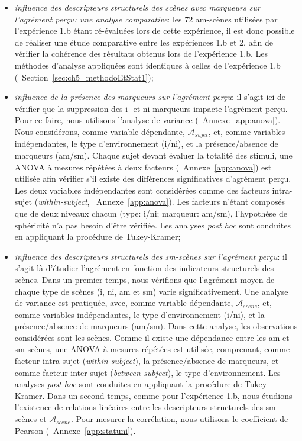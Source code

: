 \begin{itemize}
\item \emph{influence des descripteurs structurels des scènes avec marqueurs sur l'agrément perçu: une analyse comparative}: les 72 am-scènes utilisées par l'expérience 1.b étant ré-évaluées lors de cette expérience, il est donc possible de réaliser une étude comparative entre les expériences 1.b et 2, afin de vérifier la cohérence des résultats obtenus lors de l'expérience 1.b. Les méthodes d'analyse appliquées sont identiques à celles de l'expérience 1.b (\cf~Section~\ref{sec:ch5_methodoEtStat1});
\item \emph{influence de la présence des marqueurs sur l'agrément perçu}: il s'agit ici de vérifier que la suppression des i- et ni-marqueurs impacte l'agrément perçu. Pour ce faire, nous utilisons l'analyse de variance (\cf~Annexe~\ref{app:anova}). Nous considérons, comme variable dépendante,  $\mathcal{A}_{sujet}$, et, comme variables indépendantes, le type d'environnement (i/ni), et la présence/absence de marqueurs (am/sm). Chaque sujet devant évaluer la totalité des stimuli, une ANOVA à mesures répétées à deux facteurs (\cf~Annexe~\ref{app:anova}) est utilisée afin vérifier s'il existe des différences significatives d'agrément perçu. Les deux variables indépendantes sont considérées comme des facteurs intra-sujet (\emph{within-subject}, \cf~Annexe~\ref{app:anova}). Les facteurs n'étant composés que de deux niveaux chacun (type: i/ni; marqueur: am/sm), l'hypothèse de sphéricité n'a pas besoin d'être vérifiée. Les analyses \emph{post hoc} sont conduites en appliquant la procédure de Tukey-Kramer;
\item \emph{influence des descripteurs structurels des sm-scènes sur l'agrément perçu}: il s'agit là d'étudier l'agrément en fonction des indicateurs structurels des scènes. Dans un premier temps, nous vérifions que l'agrément moyen de chaque type de scènes (i, ni, am et sm) varie significativement. Une analyse de variance est pratiquée, avec, comme variable dépendante, $\mathcal{A}_{scene}$, et, comme variables indépendantes, le type d'environnement (i/ni), et la présence/absence de marqueurs (am/sm). Dans cette analyse, les observations considérées sont les scènes. Comme il existe une dépendance entre les am et sm-scènes, une ANOVA à mesures répétées est utilisée, comprenant, comme facteur intra-sujet (\emph{within-subject}), la présence/absence de marqueurs, et comme facteur inter-sujet (\emph{between-subject}), le type d'environnement. Les analyses \emph{post hoc} sont conduites en appliquant la procédure de Tukey-Kramer. Dans un second temps, comme pour l'expérience 1.b, nous étudions l'existence de relations linéaires entre les descripteurs structurels des sm-scènes et $\mathcal{A}_{scene}$. Pour mesurer la corrélation, nous utilisons le coefficient de Pearson (\cf~Annexe~\ref{app:statuni}).
\end{itemize}

